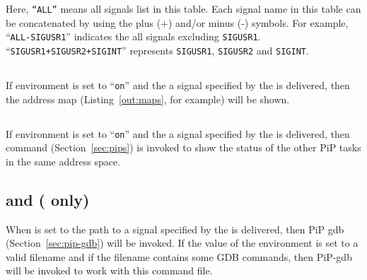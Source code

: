 Here, {\tt ``ALL''} means all signals list in this table. Each signal
name in this table can be concatenated by using the plus (+) and/or
minus (-) symbols.  For example, ``{\tt ALL-SIGUSR1}'' indicates the
all signals excluding {\tt SIGUSR1}. ``{\tt SIGUSR1+SIGUSR2+SIGINT}''
represents {\tt SIGUSR1}, {\tt SIGUSR2} and {\tt SIGINT}. 

\subsection{}

If  environment is set to ``{\tt on}'' and the
a signal specified by the  is delivered, then
the address map (Listing~\ref{out:maps}, for example) will be shown. 

\subsection{}

If  environment is set to ``{\tt on}'' and the
a signal specified by the  is delivered, then
 command (Section~\ref{sec:pips}) is invoked to show the
status of the other PiP tasks in the same address space.

\subsection{ and  ( only)}

When  is set to the path to 
a signal specified by the  is delivered, then
PiP gdb (Section~\ref{sec:pip-gdb}) will be invoked. If the value of
the  environment is set to a valid filename
and if the filename contains some GDB commands, then PiP-gdb will be
invoked to work with this command file. 
